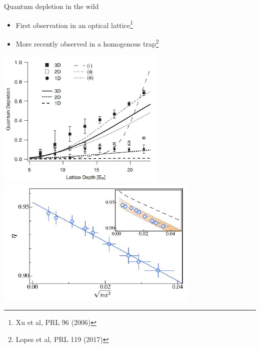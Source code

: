 \documentclass{beamer}
\begin{document}
\begin{frame}{Quantum depletion in the wild}
    \begin{itemize}
        \item First observation in an optical lattice\footnote[frame]{Xu et al, PRL 96 (2006)}
        \item More recently observed in a homogenous trap\footnote[frame]{Lopes et al, PRL 119 (2017)}
    \end{itemize}

    \begin{center}
        \includegraphics[scale=0.6]{figures/QD/xu_results.png}    
        \includegraphics[scale=0.6]{figures/QD/Lopez_results.png}  
    \end{center}
\end{frame}

\end{document}
